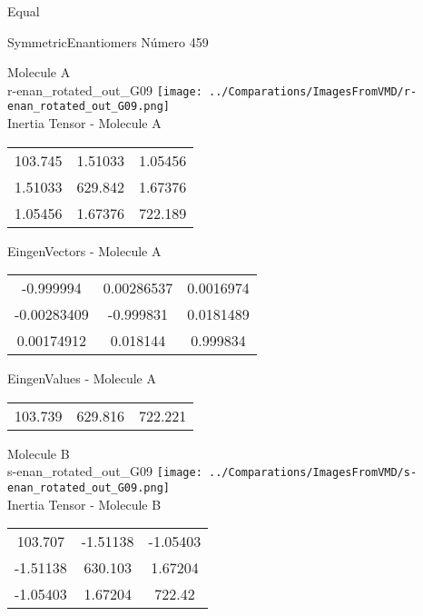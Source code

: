 \begin{center}
\vtab
\vtab
\textcolor{NavyBlue}{\Large Equal}
\end{center}

 \newpage

\vtab[-2cm]
\begin{center}
{\large SymmetricEnantiomers \tab Número 459}
\end{center}
\begin{multicols}{2}
\begin{center}

Molecule A \\ 
r-enan\_rotated\_out\_G09
\texttt{[image: ../Comparations/ImagesFromVMD/r-enan\_rotated\_out\_G09.png]}
\\
Inertia Tensor - Molecule A \\
\vtab

\begin{tabular}{|c c c|}
103.745	 & 	1.51033	 & 	1.05456	 \\
1.51033	 & 	629.842	 & 	1.67376	 \\
1.05456	 & 	1.67376	 & 	722.189
\end{tabular}

\vtab
 EingenVectors - Molecule A     \\
\vtab
\begin{tabular}{|c c c|}
-0.999994	 & 	0.00286537	 & 	0.0016974	 \\
-0.00283409	 & 	-0.999831	 & 	0.0181489	 \\
0.00174912	 & 	0.018144	 & 	0.999834
\end{tabular}

\vtab
 EingenValues - Molecule A     \\
\vtab
\begin{tabular}{|c c c|}
103.739	 & 	629.816	 & 	722.221	 \\
\end{tabular}
\columnbreak

Molecule B \\ 
s-enan\_rotated\_out\_G09
\texttt{[image: ../Comparations/ImagesFromVMD/s-enan\_rotated\_out\_G09.png]}
\\
Inertia Tensor - Molecule B \\
\vtab

\begin{tabular}{|c c c|}
103.707	 & 	-1.51138	 & 	-1.05403	 \\
-1.51138	 & 	630.103	 & 	1.67204	 \\
-1.05403	 & 	1.67204	 & 	722.42
\end{tabular}


\end{center}
\end{multicols}
